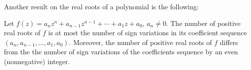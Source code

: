 Another result on the real roots of a polynomial is the following:

\begin{theorem} Let $f(z)=a_n z^n + a_{n-1} z^{n-1} + \cdots + a_1 z + a_0$, $a_n\neq 0$. The number of positive real roots of $f$ is at most the number of sign variations in its coefficient sequence $(a_n,a_{n-1},\ldots, a_1,a_0)$. Moreover, the number of positive real roots of $f$ differs from the the number of sign variations of the coefficients sequence by an even (nonnegative) integer.
\label{t:Descartes}
\end{theorem}
